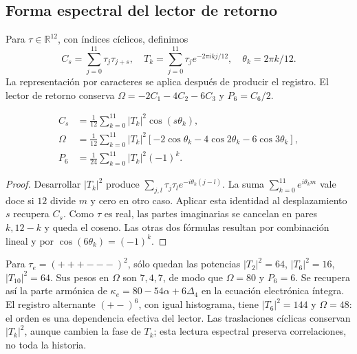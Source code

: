 \subsection{Forma espectral del lector de retorno}
Para $\tau\in\mathbb R^{12}$, con índices cíclicos, definimos
\begin{equation}
 C_s=\sum_{j=0}^{11}\tau_j\tau_{j+s},\quad
 T_k=\sum_{j=0}^{11}\tau_j e^{-2\pi i kj/12},\quad
 \theta_k=2\pi k/12.
 \label{md:r27:fourier}
\end{equation}
La representación por caracteres se aplica después de producir el registro.
El lector de retorno conserva
$\Omega=-2C_1-4C_2-6C_3$ y $P_6=C_6/2$.
\begin{proposition}
\begin{equation}
 \begin{split}
 C_s&=\frac1{12}\sum_{k=0}^{11}|T_k|^2\cos(s\theta_k),\\
 \Omega&=\frac1{12}\sum_{k=0}^{11}|T_k|^2
 [-2\cos\theta_k-4\cos2\theta_k-6\cos3\theta_k],\\
 P_6&=\frac1{24}\sum_{k=0}^{11}|T_k|^2(-1)^k.
 \end{split}
 \label{md:r27:espectro}
\end{equation}
\end{proposition}
\begin{proof}
Desarrollar $|T_k|^2$ produce
$\sum_{j,l}\tau_j\tau_l e^{-i\theta_k(j-l)}$.
La suma $\sum_{k=0}^{11}e^{i\theta_km}$ vale doce si $12$ divide $m$ y
cero en otro caso. Aplicar esta identidad al desplazamiento $s$ recupera
$C_s$. Como $\tau$ es real, las partes imaginarias se cancelan en pares
$k,12-k$ y queda el coseno. Las otras dos fórmulas resultan por combinación
lineal y por $\cos(6\theta_k)=(-1)^k$.
\end{proof}
Para $\tau_e=(+++---)^2$, sólo quedan las potencias
$|T_2|^2=64$, $|T_6|^2=16$, $|T_{10}|^2=64$. Sus pesos en $\Omega$
son $7,4,7$, de modo que $\Omega=80$ y $P_6=6$.
Se recupera así la parte armónica de
$\kappa_e=80-54\alpha+6\Delta_4$ en la ecuación electrónica íntegra.
El registro alternante $(+-)^6$, con igual histograma, tiene
$|T_6|^2=144$ y $\Omega=48$: el orden es una dependencia efectiva del lector.
Las traslaciones cíclicas conservan $|T_k|^2$, aunque cambien la fase de
$T_k$; esta lectura espectral preserva correlaciones, no toda la historia.

